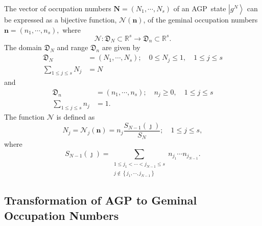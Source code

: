 \documentclass[aps,preprint]{revtex4}%
\begin{document}
The vector of occupation numbers $\mathbf{N}=\left(  N_{1},\cdots
,N_{s}\right)  $ of an AGP\ state $\left\vert g^{N}\right\rangle $ can be
expressed as a bijective function, $\mathcal{N}\left(  \mathbf{n}\right)  $,
of the geminal occupation numbers $\mathbf{n}=\left(  n_{1},\cdots
,n_{s}\right)  ,$ where
\begin{equation}
\mathcal{N}:\mathfrak{D}_{N}\subset\mathbb{R}^{s}\rightarrow\mathfrak{D}%
_{n}\subset\mathbb{R}^{s}.
\end{equation}
The domain $\mathfrak{D}_{N}$ and range $\mathfrak{D}_{n}$ are given by%
\begin{align}
\mathfrak{D}_{N}  &  =\left(  N_{1},\cdots,N_{s}\right)  ;\quad0\leq N_{j}%
\leq1,\quad1\leq j\leq s\nonumber\\
\sum_{1\leq j\leq s}N_{j}  &  =N
\end{align}
and
\begin{align}
\mathfrak{D}_{n}  &  =\left(  n_{1},\cdots,n_{s}\right)  ;\quad n_{j}%
\geq0,\quad1\leq j\leq s\nonumber\\
\sum_{1\leq j\leq s}n_{j}  &  =1.
\end{align}
The function $\mathcal{N}$ is defined as
\begin{equation}
N_{j}=\mathcal{N}_{j}\left(  \mathbf{n}\right)  =n_{j}\frac{S_{N-1}\left(
\jmath\right)  }{S_{N}};\quad1\leq j\leq s,
\end{equation}
where
\begin{equation}
S_{N-1}\left(  \jmath\right)  =\sum_{\substack{1\leq j_{1}<\cdots<j_{N-1}\leq
s\\j\notin\left\{  j_{1},\cdots,j_{N-1}\right\}  }}n_{j_{1}}\cdots n_{j_{N-1}%
}.
\end{equation}


\subsection{Transformation of AGP to Geminal Occupation
Numbers\label{AGPoccGemocc}}
\end{document}
